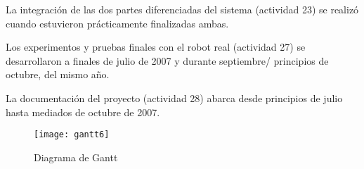 La integración de las dos partes diferenciadas del sistema (actividad 23) se realizó cuando estuvieron prácticamente finalizadas ambas.

Los experimentos y pruebas finales con el robot real (actividad 27) se desarrollaron a finales de julio de 2007 y durante septiembre/ principios de octubre, del mismo año.

La documentación del proyecto (actividad 28) abarca desde principios de julio hasta mediados de octubre de 2007.

\clearpage
\begin{figure}
  \centering\texttt{[image: gantt6]}\\
  \caption{Diagrama de Gantt}\label{fg:gantt}
\end{figure}

